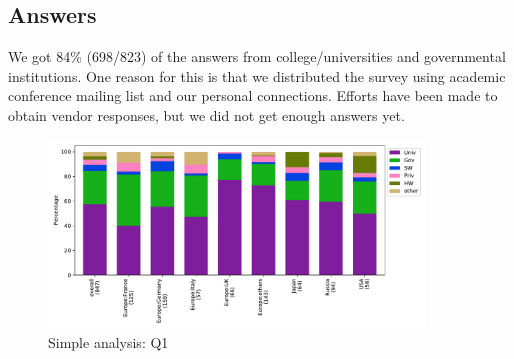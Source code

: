 
\subsection{Answers}


We got 84\% (698/823) of the answers from college/universities and 
governmental institutions. One reason for this is that we distributed
the survey using academic conference mailing list and our personal 
connections. Efforts have been made to obtain vendor responses, 
but we did not get enough answers yet.

\begin{figure}[htb]
\begin{center}
\includegraphics[width=10cm]{../pdfs/Q1.pdf}
\caption{Simple analysis: Q1}
\label{fig:Q1}
\end{center}
\end{figure}
